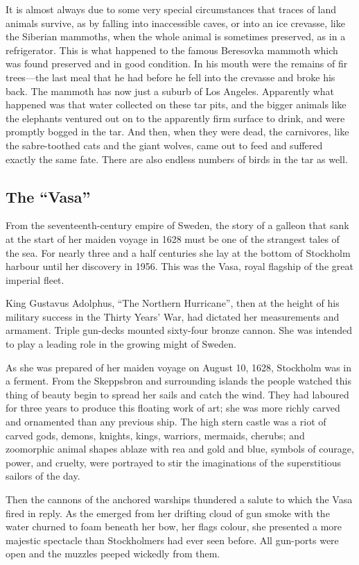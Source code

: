 \documentclass[11pt]{article}
\begin{document}
It is almost always due to some very special circumstances that traces of land animals survive, as by falling into inaccessible caves, or into an ice crevasse, like the Siberian mammoths, when the whole animal is sometimes preserved, as in a refrigerator. This is what happened to the famous Beresovka mammoth which was found preserved and in good condition. In his mouth were the remains of fir trees---the last meal that he had before he fell into the crevasse and broke his back. The mammoth has now just a suburb of Los Angeles. Apparently what happened was that water collected on these tar pits, and the bigger animals like the elephants ventured out on to the apparently firm surface to drink, and were promptly bogged in the tar. And then, when they were dead, the carnivores, like the sabre-toothed cats and the giant wolves, came out to feed and suffered exactly the same fate. There are also endless numbers of birds in the tar as well.
\subsection{The ``Vasa''}
\label{sec-2-27}

From the seventeenth-century empire of Sweden, the story of a galleon that sank at the start of her maiden voyage in 1628 must be one of the strangest tales of the sea. For nearly three and a half centuries she lay at the bottom of Stockholm harbour until her discovery in 1956. This was the Vasa, royal flagship of the great imperial fleet.

King Gustavus Adolphus, ``The Northern Hurricane'', then at the height of his military success in the Thirty Years' War, had dictated her measurements and armament. Triple gun-decks mounted sixty-four bronze cannon. She was intended to play a leading role in the growing might of Sweden.

As she was prepared of her maiden voyage on August 10, 1628, Stockholm was in a ferment. From the Skeppsbron and surrounding islands the people watched this thing of beauty begin to spread her sails and catch the wind. They had laboured for three years to produce this floating work of art; she was more richly carved and ornamented than any previous ship. The high stern castle was a riot of carved gods, demons, knights, kings, warriors, mermaids, cherubs; and zoomorphic animal shapes ablaze with rea and gold and blue, symbols of courage, power, and cruelty, were portrayed to stir the imaginations of the superstitious sailors of the day.

Then the cannons of the anchored warships thundered a salute to which the Vasa fired in reply. As the emerged from her drifting cloud of gun smoke with the water churned to foam beneath her bow, her flags colour, she presented a more majestic spectacle than Stockholmers had ever seen before. All gun-ports were open and the muzzles peeped wickedly from them.
\end{document}
